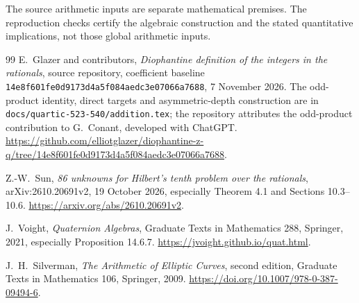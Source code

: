 \documentclass[11pt,a4paper]{article}
\theoremstyle{definition}
\theoremstyle{remark}
\begin{document}
The source arithmetic inputs are separate mathematical premises.
The reproduction checks certify the algebraic construction and the
stated quantitative implications, not those global arithmetic inputs.
\begin{thebibliography}{99}
\small
{}
E.~Glazer and contributors, \emph{Diophantine definition of the integers
in the rationals}, source repository, coefficient baseline
\texttt{14e8f601fe0d9173d4a5f084aedc3e07066a7688}, 7 November 2026.
The odd-product identity, direct targets and asymmetric-depth
construction are in \texttt{docs/quartic-523-540/addition.tex}; the
repository attributes the odd-product contribution to G.~Conant,
developed with ChatGPT.
\url{https://github.com/elliotglazer/diophantine-z-q/tree/14e8f601fe0d9173d4a5f084aedc3e07066a7688}.


Z.-W.~Sun, \emph{86 unknowns for Hilbert's tenth problem over
the rationals}, arXiv:2610.20691v2, 19 October 2026,
especially Theorem 4.1 and Sections 10.3--10.6.
\url{https://arxiv.org/abs/2610.20691v2}.


J.~Voight, \emph{Quaternion Algebras}, Graduate Texts in
Mathematics 288, Springer, 2021, especially Proposition 14.6.7.
\url{https://jvoight.github.io/quat.html}.


J.~H.~Silverman, \emph{The Arithmetic of Elliptic Curves},
second edition, Graduate Texts in Mathematics 106, Springer, 2009.
\url{https://doi.org/10.1007/978-0-387-09494-6}.


\end{thebibliography}
\end{document}
